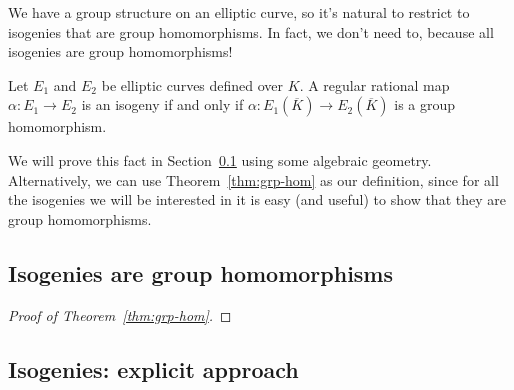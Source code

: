 We have a group structure on an elliptic curve, so it's natural to restrict to isogenies that are group homomorphisms. In fact, we don't need to, because all isogenies are group homomorphisms!

\begin{thm}\label{thm:grp-hom}
Let $E_1$ and $E_2$ be elliptic curves defined over $K$.
A regular rational map $\alpha\colon E_1\to E_2$ is an isogeny if and only if $\alpha\colon E_1(\overline{K}) \rightarrow E_2(\overline{K})$ is a group homomorphism. 
\end{thm}
We will prove this fact in Section~\ref{sec:isog-hom} using some algebraic geometry. Alternatively, we can use Theorem~\ref{thm:grp-hom} as our definition, since for all the isogenies we will be interested in it is easy (and useful) to show that they are group homomorphisms.



\subsection{Isogenies are group homomorphisms}\label{sec:isog-hom}

\begin{proof}[Proof of Theorem~\ref{thm:grp-hom}]

\end{proof}

\subsection{Isogenies: explicit approach}\label{sec:hom}

